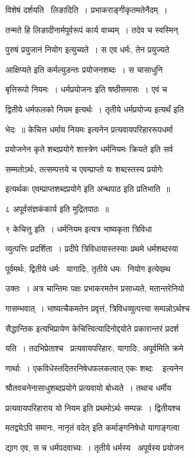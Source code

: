 \documentclass[11pt, openany]{book}
\begin{document}
विशेषं दर्शयति \textendash\ लिङादिति~। प्रभाकराङ्गीकृतमतेनैदम्~। 

तन्मते हि लिङादीनार्मपूर्वरूपं कार्य वाच्यम्~। तदेव च स्वस्मिन् 

पुरुषं प्रयुजानं नियोग इत्युच्यते~। स एव धर्मः, तेन प्रयुज्यते \textendash\ 

आक्षिप्यते इति कर्मल्युडन्तः प्रयोजनशब्दः~। स चासाधुनि \textendash\ 

बृत्तिरूपो नियमः~। {\qt धर्मप्रयोजनः} इति षष्ठीसमासः~। एवं च 

द्वितीये धर्मफलको नियम इत्यर्थः~। तृतीये धर्मप्रयोज्य इत्यर्थं इति 

भेदः~॥ {\qt केचित्त धर्माय नियमः} इत्यनेन प्रत्यवायपरिहाररूपधर्मा \textendash\ 



प्रयोजनेन कृते शब्दप्रयोगे {\qt शास्त्रेण धर्मनियमः क्रियते} इति सर्व \textendash\ 

सम्मतोऽर्थः, तत्सम्पत्तये च एवम्प्राप्तो यः शब्दस्तस्य प्रयोगेः 

इत्यर्थकः {\qt एवम्प्राप्तशब्दप्रयोगे} इति अन्थपाठ इति प्रतिभाति~॥ 

८ {\qt अपूर्वसंज्ञकंकार्य इति मुद्रितपाठः~॥} 

९ केचित्तु इति~। धर्मनियम इत्यत्र भाष्यकृता त्रिविधा 

व्युत्पत्तिः प्रदर्शिता~। प्रदीपे त्रिविधायास्तस्याः प्रथमे
धर्मशब्दस्या \textendash\ 

पूर्वमर्थः, द्वितीये धर्मः \textendash\ यागादिः, तृतीये धमः \textendash\ नियोग इत्येवम्र्थ 

उक्तः~। अत्र चान्तिमः पक्षः प्रभाकरमतेन प्रसाध्यते, मतान्तरेनियो \textendash\ 

गासम्भवात्~। भाष्यत्चैकमतेन प्रवृत्तं, त्रिविधव्युत्पत्त्या
सम्पन्नोऽर्थश्च 

सैद्धान्तिक इत्यभिप्रायेण केचित्त्वित्यादिनोद्दयोते प्रकारान्तरं
प्रदर्श \textendash\ 

यति~। तदभिप्रेताश्च \textendash\ प्रत्यवायपरिहारः, यागादिः, अपूर्वमिति क्रमे \textendash\ 

णार्थाः~। एकविधेस्तदितरनिषेधफलकत्वात् {\qt एकः शब्दः \textendash\ } इत्यनेन 

श्रौतवचनेनासाधुशब्दप्रयोगे प्रत्यवायो बोध्यते~। तथाच धर्मीय \textendash\ 

प्रत्यवायपरिहाराय यो नियम इति प्रथमोऽर्थः सम्पन्नः~। द्वितीयश्च 

मतद्व्येऽपि समानः, {\qt नानृतं वदेत्} इति कर्माङ्गनिषेधो यागाङ्गत्वा \textendash\ 

द्याग एव, स च धर्मपदवाच्यः~। तृतीये धर्मस्य \textendash\ अपूर्वस्य प्रयोजन 
\end{document}
